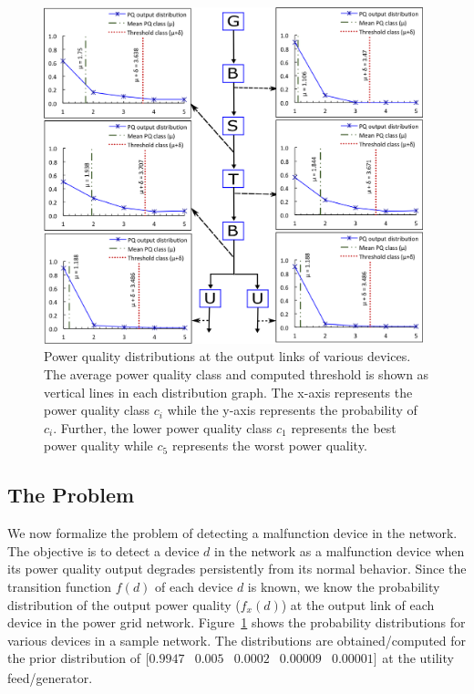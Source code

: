 \documentclass[12pt,oneside]{book}
\begin{document}
\begin{figure}[!t]
\centering
\includegraphics[width=0.98\textwidth]{PQOutputDistribution}
\caption{Power quality distributions at the output links of various devices. The average power quality class and computed threshold is shown as vertical lines in each  distribution graph. The x-axis represents the power quality class $c_i$ while the y-axis represents the probability of $c_i$. Further, the lower power quality class $c_1$ represents the best power quality while $c_5$ represents the worst power quality.}
\label{fig:outputPQDistributions}
\end{figure}

\subsection{The Problem}
We now formalize the problem of detecting a malfunction device in the network. The objective is to detect a device $d$ in the network as a malfunction device when its power quality output degrades persistently from its normal behavior. Since the transition function $f(d)$ of each device $d$ is known, we know the probability distribution of the output power quality ($f_x\left(d\right)$) at the output link of each device in the power grid network. Figure~\ref{fig:outputPQDistributions} shows the probability distributions for various devices in a sample network. The distributions are obtained/computed for the prior distribution of$\begin{array}{ccccc}[0.9947 & 0.005 & 0.0002 & 0.00009 & 0.00001]\end{array}$at the utility feed/generator.
\end{document}
